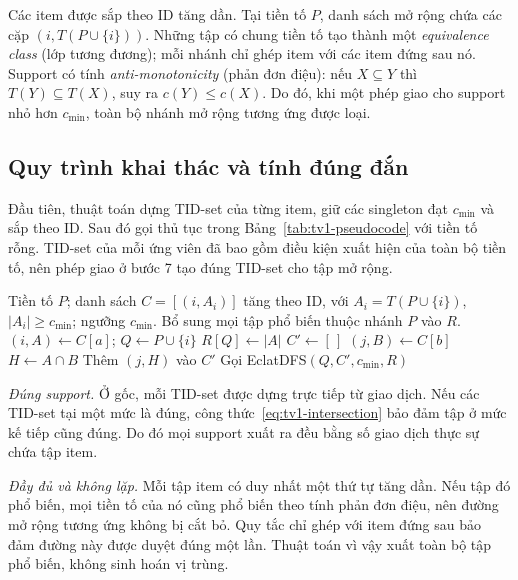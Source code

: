 Các item được sắp theo ID tăng dần. Tại tiền tố $P$, danh sách mở rộng chứa các cặp $(i,T(P\cup\{i\}))$. Những tập có chung tiền tố tạo thành một \emph{equivalence class} (lớp tương đương); mỗi nhánh chỉ ghép item với các item đứng sau nó. Support có tính \emph{anti-monotonicity} (phản đơn điệu): nếu $X\subseteq Y$ thì $T(Y)\subseteq T(X)$, suy ra $c(Y)\le c(X)$. Do đó, khi một phép giao cho support nhỏ hơn $c_{\min}$, toàn bộ nhánh mở rộng tương ứng được loại.

\subsection{Quy trình khai thác và tính đúng đắn}
Đầu tiên, thuật toán dựng TID-set của từng item, giữ các singleton đạt $c_{\min}$ và sắp theo ID. Sau đó gọi thủ tục trong Bảng~\ref{tab:tv1-pseudocode} với tiền tố rỗng. TID-set của mỗi ứng viên đã bao gồm điều kiện xuất hiện của toàn bộ tiền tố, nên phép giao ở bước 7 tạo đúng TID-set cho tập mở rộng.

\begin{table}[t]
\caption{Giả mã DFS dùng chung cho hai phiên bản Eclat.}
\label{tab:tv1-pseudocode}
\begin{minipage}{\columnwidth}
\small
\begin{algorithmic}[1]
\REQUIRE Tiền tố $P$; danh sách $C=[(i,A_i)]$ tăng theo ID, với $A_i=T(P\cup\{i\})$, $|A_i|\ge c_{\min}$; ngưỡng $c_{\min}$.
\ENSURE Bổ sung mọi tập phổ biến thuộc nhánh $P$ vào $R$.
  \STATE $(i,A)\gets C[a]$; $Q\gets P\cup\{i\}$
  \STATE $R[Q]\gets |A|$
  \STATE $C'\gets [\,]$
    \STATE $(j,B)\gets C[b]$
    \STATE $H\gets A\cap B$
      \STATE Thêm $(j,H)$ vào $C'$
    \ENDIF
  \ENDFOR
    \STATE Gọi EclatDFS$(Q,C',c_{\min},R)$
  \ENDIF
\ENDFOR
\end{algorithmic}
\end{minipage}
\end{table}

\textit{Đúng support.} Ở gốc, mỗi TID-set được dựng trực tiếp từ giao dịch. Nếu các TID-set tại một mức là đúng, công thức~\eqref{eq:tv1-intersection} bảo đảm tập ở mức kế tiếp cũng đúng. Do đó mọi support xuất ra đều bằng số giao dịch thực sự chứa tập item.

\textit{Đầy đủ và không lặp.} Mỗi tập item có duy nhất một thứ tự tăng dần. Nếu tập đó phổ biến, mọi tiền tố của nó cũng phổ biến theo tính phản đơn điệu, nên đường mở rộng tương ứng không bị cắt bỏ. Quy tắc chỉ ghép với item đứng sau bảo đảm đường này được duyệt đúng một lần. Thuật toán vì vậy xuất toàn bộ tập phổ biến, không sinh hoán vị trùng.

